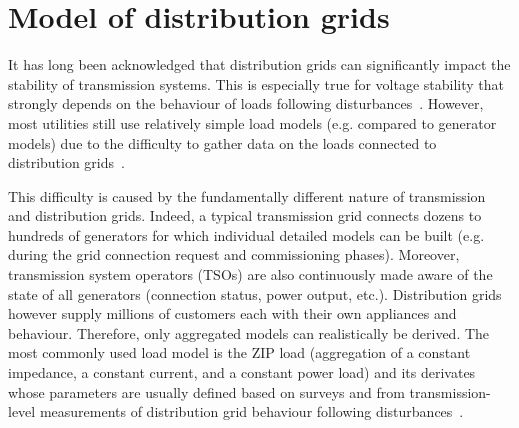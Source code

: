 \chapter{Model of distribution grids}
\label{ch:distrib}
\minitoc

It has long been acknowledged that distribution grids can significantly impact the stability of transmission systems. This is especially true for voltage stability that strongly depends on the behaviour of loads following disturbances~\cite{CutsemBook, kundur}. However, most utilities still use relatively simple load models (e.g. compared to generator models) due to the difficulty to gather data on the loads connected to distribution grids~\cite{IndustryLoadModel}.

This difficulty is caused by the fundamentally different nature of transmission and distribution grids. Indeed, a typical transmission grid connects dozens to hundreds of generators for which individual detailed models can be built (e.g. during the grid connection request and commissioning phases). Moreover, transmission system operators (TSOs) are also continuously made aware of the state of all generators (connection status, power output, etc.). Distribution grids however supply millions of customers each with their own appliances and behaviour. Therefore, only aggregated models can realistically be derived. The most commonly used load model is the ZIP load (aggregation of a constant impedance, a constant current, and a constant power load) and its derivates whose parameters are usually defined based on surveys and from transmission-level measurements of distribution grid behaviour following disturbances~\cite{IndustryLoadModel}.



